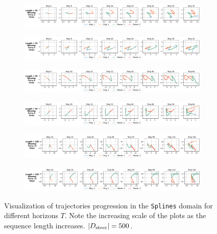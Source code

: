 \documentclass[nohyperref]{article}
\begin{document}
\begin{figure}[]
    \vspace{1em}
    \begin{subfigure}{1\textwidth}
        \centering
        \includegraphics[width=\textwidth,keepaspectratio]{figures/iclr_plots/splines_32_strip_1.png}
    \end{subfigure}
    \begin{subfigure}{1\textwidth}
        \centering
        \includegraphics[width=\textwidth,keepaspectratio]{figures/iclr_plots/splines_32_strip_2.png}
    \end{subfigure}
    \begin{subfigure}{1\textwidth}
        \centering
        \includegraphics[width=\textwidth,keepaspectratio]{figures/iclr_plots/splines_64_strip_1.png}
    \end{subfigure}
    \begin{subfigure}{1\textwidth}
        \centering
        \includegraphics[width=\textwidth,keepaspectratio]{figures/iclr_plots/splines_64_strip_2.png}
    \end{subfigure}
    \begin{subfigure}{1\textwidth}
        \centering
        \includegraphics[width=\textwidth,keepaspectratio]{figures/iclr_plots/splines_128_strip_1.png}
    \end{subfigure}
    \begin{subfigure}{1\textwidth}
        \centering
        \includegraphics[width=\textwidth,keepaspectratio]{figures/iclr_plots/splines_128_strip_2.png}
    \end{subfigure}
    \caption{Visualization of trajectories progression in the \texttt{Splines} domain for different horizons $T$. Note the increasing scale of the plots as the sequence length increases. $|D_{\mathrm{steer}}| = 500$.
    }
    \label{fig:splines_multi_length_strips}
\end{figure}
\end{document}
